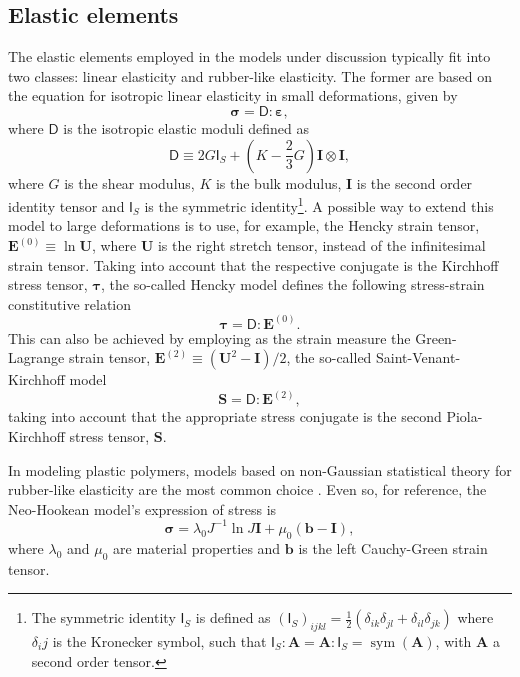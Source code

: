 \subsection{Elastic elements}

The elastic elements employed in the models under discussion typically fit into two classes: linear elasticity and rubber-like elasticity.
The former are based on the equation for isotropic linear elasticity in small deformations, given by
\begin{equation}
	\bm \sigma=\bm{\mathsf D}:\bm \varepsilon,
\end{equation}
where $\bm{\mathsf D}$ is the isotropic elastic moduli defined as
\begin{equation}
\bm{\mathsf D}\equiv 2 G \bm{\mathsf I}_S+\left(K-\frac{2}{3} G\right) \bm I \otimes \bm I ,
\end{equation}
where $G$ is the shear modulus, $K$ is the bulk modulus, $\bm I$ is the second order identity tensor and $\bm{\mathsf I}_S$ is the symmetric identity\footnote{The symmetric identity $\bm{\mathsf I}_S$ is defined as $(\bm{\mathsf I}_S)_{ijkl} =\frac{1}{2}(\delta_{ik}\delta_{jl} + \delta_{il}\delta_{jk})$ where $\delta_ij$ is the Kronecker symbol, such that $\bm{\mathsf I}_S: \bm A = \bm A: \bm{\mathsf I}_S = \operatorname{sym} (\bm A)$, with $\bm A$ a second order tensor.}.
A possible way to extend this model to large deformations is to use, for example, the Hencky strain tensor, $\bm E^{(0)}\equiv \ln \bm U$, where $\bm U$ is the right stretch tensor, instead of the infinitesimal strain tensor.
Taking into account that the respective conjugate is the Kirchhoff stress tensor, $\bm \tau$, the so-called Hencky model defines the following stress-strain constitutive relation
\begin{equation}
	\label{eq:hencky_model}
	\pmb \tau=\bm{\mathsf D}:\bm E^{(0)}.
\end{equation}
This can also be achieved by employing as the strain measure the Green-Lagrange strain tensor, $\bm E^{(2)}\equiv (\bm U^2 - \bm I)/2$, the so-called Saint-Venant-Kirchhoff model
\begin{equation}
	\label{eq:saint_venant_kirchhoff}
	\bm S = \bm{\mathsf D}: \bm E^{(2)},
\end{equation}
taking into account that the appropriate stress conjugate is the second Piola-Kirchhoff stress tensor, $\bm S$.

In modeling plastic polymers, models based on non-Gaussian statistical theory for rubber-like elasticity are the most common choice \citep{holzapfelNonlinearSolidMechanics2000}.
Even so, for reference, the Neo-Hookean model's expression of stress is
\begin{equation}
  \label{eq:neo_hookean_model}
	\bm \sigma = \lambda_0 J^{-1}\ln J \bm{I}+\mu_0\left(\bm{b}-\bm{I}\right),
\end{equation}
where $\lambda_0$ and $\mu_0$ are material properties and $\bm b$ is the left Cauchy-Green strain tensor.

